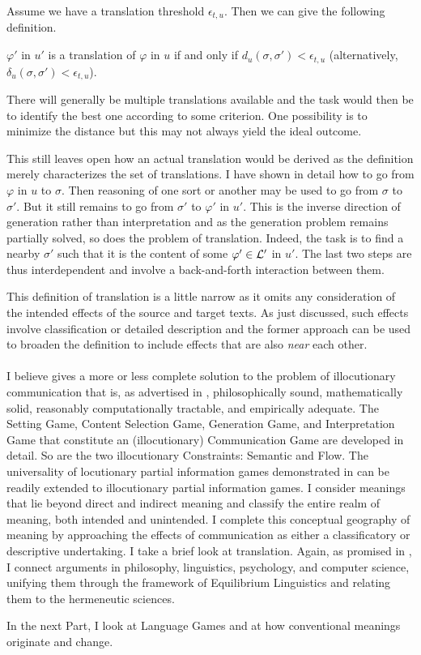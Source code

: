 Assume we have a translation threshold $\epsilon_{t,u}$. Then we can give the following definition.

\begin{definition}

$\varphi'$ in $u'$ is a translation of $\varphi$ in $u$ if and only if $d_u(\sigma, \sigma') < \epsilon_{t,u}$ (alternatively, $\delta_u(\sigma, \sigma') < \epsilon_{t,u}$).

\label{def:translation}
\end{definition}

There will generally be multiple translations available and the task would then be to identify the best one according to some criterion. One possibility is to minimize the distance but this may not always yield the ideal outcome.

This still leaves open how an actual translation would be derived as the definition merely characterizes the set of translations. I have shown in detail how to go from $\varphi$ in $u$ to $\sigma$. Then reasoning of one sort or another may be used to go from $\sigma$ to $\sigma'$. But it still remains to go from $\sigma'$ to $\varphi'$ in $u'$. This is the inverse direction of generation rather than interpretation and as the generation problem remains partially solved, so does the problem of translation. Indeed, the task is to find a nearby $\sigma'$ such that it is the content of some $\varphi' \in {\cal L}'$ in $u'$. The last two steps are thus interdependent and involve a back-and-forth interaction between them.

This definition of translation is a little narrow as it omits any consideration of the intended effects of the source and target texts. As just discussed, such effects involve classification or detailed description and the former approach can be used to broaden the definition to include effects that are also \emph{near} each other.\\\\
I believe  gives a more or less complete solution to the problem of illocutionary communication that is, as advertised in , philosophically sound, mathematically solid, reasonably computationally tractable, and empirically adequate. The Setting Game, Content Selection Game, Generation Game, and Interpretation Game that constitute an (illocutionary) Communication Game are developed in detail. So are the two illocutionary Constraints: Semantic and Flow. The universality of locutionary partial information games demonstrated in  can be readily extended to illocutionary partial information games. I consider meanings that lie beyond direct and indirect meaning and classify the entire realm of meaning, both intended and unintended. I complete this conceptual geography of meaning by approaching the effects of communication as either a classificatory or descriptive undertaking. I take a brief look at translation. Again, as promised in , I connect arguments in philosophy, linguistics, psychology, and computer science, unifying them through the framework of Equilibrium Linguistics and relating them to the hermeneutic sciences. 

In the next Part, I look at Language Games and at how conventional meanings originate and change.



